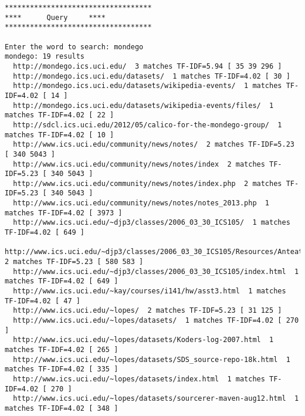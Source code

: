 \documentclass[paper=a4, fontsize=11pt]{scrartcl} %
\numberwithin{equation}{section} %
\numberwithin{table}{section} %
\begin{document}
\begin{small}

\begin{verbatim}
***********************************
****      Query     ****
***********************************

Enter the word to search: mondego
mondego: 19 results
  http://mondego.ics.uci.edu/  3 matches TF-IDF=5.94 [ 35 39 296 ]
  http://mondego.ics.uci.edu/datasets/  1 matches TF-IDF=4.02 [ 30 ]
  http://mondego.ics.uci.edu/datasets/wikipedia-events/  1 matches TF-IDF=4.02 [ 14 ]
  http://mondego.ics.uci.edu/datasets/wikipedia-events/files/  1 matches TF-IDF=4.02 [ 22 ]
  http://sdcl.ics.uci.edu/2012/05/calico-for-the-mondego-group/  1 matches TF-IDF=4.02 [ 10 ]
  http://www.ics.uci.edu/community/news/notes/  2 matches TF-IDF=5.23 [ 340 5043 ]
  http://www.ics.uci.edu/community/news/notes/index  2 matches TF-IDF=5.23 [ 340 5043 ]
  http://www.ics.uci.edu/community/news/notes/index.php  2 matches TF-IDF=5.23 [ 340 5043 ]
  http://www.ics.uci.edu/community/news/notes/notes_2013.php  1 matches TF-IDF=4.02 [ 3973 ]
  http://www.ics.uci.edu/~djp3/classes/2006_03_30_ICS105/  1 matches TF-IDF=4.02 [ 649 ]
  http://www.ics.uci.edu/~djp3/classes/2006_03_30_ICS105/Resources/AnteaterIdol.html  2 matches TF-IDF=5.23 [ 580 583 ]
  http://www.ics.uci.edu/~djp3/classes/2006_03_30_ICS105/index.html  1 matches TF-IDF=4.02 [ 649 ]
  http://www.ics.uci.edu/~kay/courses/i141/hw/asst3.html  1 matches TF-IDF=4.02 [ 47 ]
  http://www.ics.uci.edu/~lopes/  2 matches TF-IDF=5.23 [ 31 125 ]
  http://www.ics.uci.edu/~lopes/datasets/  1 matches TF-IDF=4.02 [ 270 ]
  http://www.ics.uci.edu/~lopes/datasets/Koders-log-2007.html  1 matches TF-IDF=4.02 [ 265 ]
  http://www.ics.uci.edu/~lopes/datasets/SDS_source-repo-18k.html  1 matches TF-IDF=4.02 [ 335 ]
  http://www.ics.uci.edu/~lopes/datasets/index.html  1 matches TF-IDF=4.02 [ 270 ]
  http://www.ics.uci.edu/~lopes/datasets/sourcerer-maven-aug12.html  1 matches TF-IDF=4.02 [ 348 ]

\end{verbatim}
\end{small}

\end{document}
